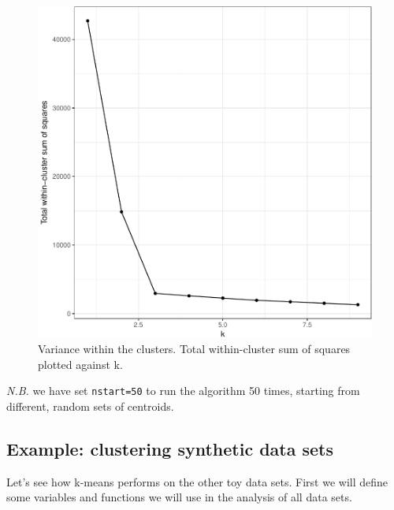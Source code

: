 \documentclass[]{book}
\theoremstyle{definition}
\theoremstyle{definition}
\theoremstyle{definition}
\theoremstyle{remark}
\begin{document}
\begin{figure}

{\centering \includegraphics[width=0.5\linewidth]{09-clustering_files/figure-latex/choosingK-1} 

}

\caption{Variance within the clusters. Total within-cluster sum of squares plotted against k.}\label{fig:choosingK}
\end{figure}

\emph{N.B.} we have set \texttt{nstart=50} to run the algorithm 50
times, starting from different, random sets of centroids.

\subsection{Example: clustering synthetic data
sets}\label{example-clustering-synthetic-data-sets-1}

Let's see how k-means performs on the other toy data sets. First we will
define some variables and functions we will use in the analysis of all
data sets.
\end{document}
